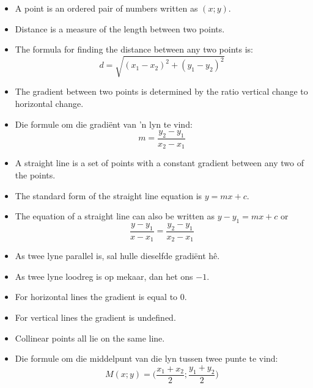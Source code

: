 \summary{}
\begin{itemize}[noitemsep]
\item A point is an ordered pair of numbers written as $(x;y)$.
\item Distance is a measure of the length between two points.
\item The formula for finding the distance between  any two points is: 
\begin{equation*}
d=\sqrt{{({x}_{1}-{x}_{2})}^{2}+{({y}_{1}-{y}_{2})}^{2}}
\end{equation*}
\item The gradient between two points is determined by the ratio vertical change to horizontal change.

\item Die formule om die gradiënt van ’n lyn te vind: 
\begin{equation*}
m=\frac{{y}_{2}-{y}_{1}}{{x}_{2}-{x}_{1}}
\end{equation*}
\item A straight line is a set of points with a constant gradient between any two of the
points.
\item The standard form of the straight line equation is $y=mx+c$.
\item The equation of a straight line can also be written as $y-y_1=mx+c$  or 
\begin{equation*}
\dfrac{y-y_1}{x-x_1}=\dfrac{y_2-y_1}{x_2-x_1}\end{equation*}
\item As twee lyne parallel is, sal hulle dieselfde gradiënt hê.
\item As twee lyne loodreg is op mekaar,
dan het ons $-1$.
\item For horizontal lines the gradient is equal to $0$.
\item For vertical lines the gradient is undefined.
\item Collinear points all lie on the same line.
\item Die formule om die middelpunt van die lyn tussen twee punte te vind: 
\begin{equation*}
M(x;y) = \Big(\frac{{x}_{1}+{x}_{2}}{2};\frac{{y}_{1}+{y}_{2}}{2}\Big)
\end{equation*}
\end{itemize}



